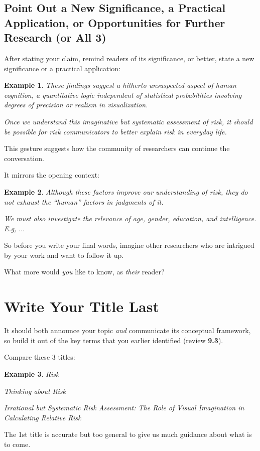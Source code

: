 \documentclass[oneside]{book}
\numberwithin{equation}{section}
\newtheorem{example}{Example}[section]
\begin{document}
\subsection{Point Out a New Significance, a Practical Application, or Opportunities for Further Research (or All 3)}
After stating your claim, remind readers of its significance, or better, state a new significance or a practical application:
\begin{example}
    These findings suggest a hitherto unsuspected aspect of human cognition, a quantitative logic independent of statistical probabilities involving degrees of precision or realism in visualization.
    
    Once we understand this imaginative but systematic assessment of risk, it should be possible for risk communicators to better explain risk in everyday life.
\end{example}

This gesture suggests how the community of researchers can continue the conversation.

It mirrors the opening context:
\begin{example}
    Although these factors improve our understanding of risk, they do not exhaust the ``human'' factors in judgments of it.
    
    We must also investigate the relevance of age, gender, education, and intelligence. E.g, $\ldots$
\end{example}

So before you write your final words, imagine other researchers who are intrigued by your work and want to follow it up.

What more would \textit{you} like to know, as \textit{their} reader?


\section{Write Your Title Last}

It should both announce your topic \textit{and} communicate its conceptual framework, so build it out of the key terms that you earlier identified (review \textbf{9.3}).

Compare these 3 titles:
\begin{example}
    Risk
    
    Thinking about Risk
    
    Irrational but Systematic Risk Assessment: The Role of Visual Imagination in Calculating Relative Risk
\end{example}
The 1st title is accurate but too general to give us much guidance about what is to come.
\end{document}
